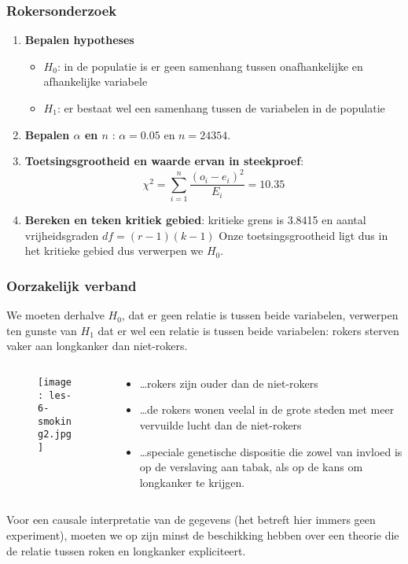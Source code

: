 \documentclass[aspectratio=169]{beamer}
\begin{document}
\begin{frame}
  \frametitle{Rokersonderzoek}
  \begin{enumerate}
    \item \textbf{Bepalen hypotheses}
    \begin{itemize}
      \item $H_{0}$: in de populatie is er geen samenhang tussen onafhankelijke en afhankelijke variabele
      \item $H_{1}$: er bestaat wel een samenhang tussen de variabelen in de populatie
    \end{itemize}
    \item \textbf{Bepalen $\alpha$ en $n$} : $\alpha = 0.05$ en $n = 24354$.
    \item \textbf{Toetsingsgrootheid en waarde ervan in steekproef}:
    \[ \chi^{2} = \sum_{i=1}^{n} \frac{(o_{i} - e_{i})^{2}}{E_{i}} = 10.35 \]
    \item \textbf{Bereken en teken kritiek gebied}:  kritieke grens is 3.8415 en aantal vrijheidsgraden $df = (r-1)(k-1)$ Onze toetsingsgrootheid ligt dus in het kritieke gebied dus verwerpen we $H_{0}$.
  \end{enumerate}
\end{frame}

\begin{frame}
  \frametitle{Oorzakelijk verband}
  We moeten derhalve $H_{0}$, dat er geen relatie is tussen beide variabelen, verwerpen ten gunste van $H_{1}$ dat er wel een relatie is tussen beide variabelen: rokers sterven vaker aan longkanker dan niet-rokers.
  \begin{columns}
    \begin{column}{0.3 \textwidth}
      
      \begin{figure}
        \centering
        \texttt{[image: les-6-smoking2.jpg]}
      \end{figure}
      
    \end{column}
    \begin{column}{0.7 \textwidth}
      
      \begin{itemize}
        \item  \dots rokers zijn ouder dan de niet-rokers
        \item \dots de rokers wonen veelal in de grote steden met
        meer vervuilde lucht dan de niet-rokers
        \item \dots speciale genetische dispositie die zowel van invloed is op de verslaving aan tabak, als op de kans om longkanker te krijgen.
      \end{itemize}
    \end{column}
  \end{columns}
  Voor een causale interpretatie van de gegevens (het betreft hier immers geen experiment), moeten we op zijn minst de beschikking hebben over een theorie die de relatie tussen roken en longkanker expliciteert.
  
\end{frame}
\end{document}
